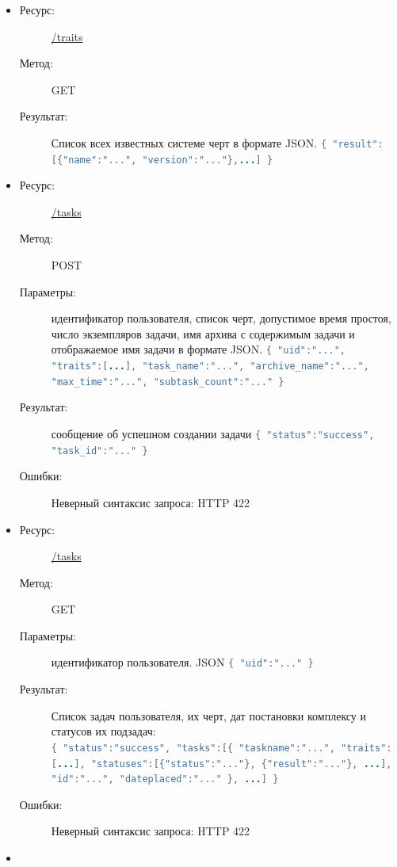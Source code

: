 \documentclass[a4paper,12pt]{report}
\numberwithin{equation}{section}
\begin{document}
  \begin{itemize}
    \item
    \begin{description}
      \item[Ресурс:] \url{/traits}
      \item[Метод:] GET
      \item[Результат:] Список всех известных системе черт в формате JSON. 
      \lstinline[language=Java]|{ "result":[{"name":"...", "version":"..."},...] }|
    \end{description}
    \item
    \begin{description}
      \item[Ресурс:] \url{/tasks}
      \item[Метод:] POST
      \item[Параметры:] идентификатор пользователя, список черт, допустимое время простоя, число экземпляров задачи, имя архива с содержимым задачи и отображаемое имя задачи в формате JSON.
      \lstinline[language=Java]|{ "uid":"...", "traits":[...], "task_name":"...", "archive_name":"...", "max_time":"...", "subtask_count":"..." }|
      \item[Результат:] сообщение об успешном создании задачи
      \lstinline[language=Java]|{ "status":"success", "task_id":"..." }|
      \item[Ошибки:] Неверный синтаксис запроса: HTTP 422
    \end{description}
    \item
    \begin{description}
      \item[Ресурс:] \url{/tasks}
      \item[Метод:] GET
      \item[Параметры:] идентификатор пользователя. JSON 
      \lstinline[language=Java]|{ "uid":"..." }|
      \item[Результат:] Список задач пользователя, их черт, дат постановки комплексу и статусов их подзадач:
      \\
      \lstinline[language=Java]|{ "status":"success", "tasks":[{ "taskname":"...", "traits":[...], "statuses":[{"status":"..."}, {"result":"..."}, ...], "id":"...", "dateplaced":"..." }, ...] }|
      \item[Ошибки:] Неверный синтаксис запроса: HTTP 422
    \end{description}
    \item
    \begin{description}

\end{description}
\end{itemize}
\end{document}
